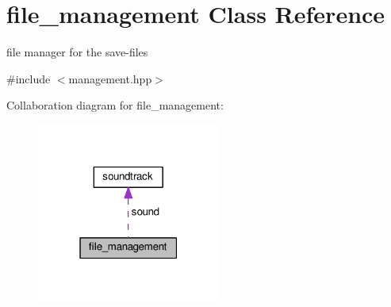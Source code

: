 \hypertarget{classfile__management}{}\section{file\+\_\+management Class Reference}
\label{classfile__management}


file manager for the save-\/files  




{\ttfamily \#include $<$management.\+hpp$>$}



Collaboration diagram for file\+\_\+management\+:\nopagebreak
\begin{figure}[H]
\begin{center}
\leavevmode
\includegraphics[width=171pt]{classfile__management__coll__graph}
\end{center}
\end{figure}
